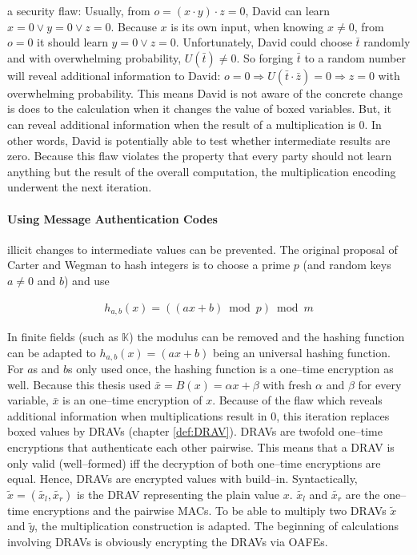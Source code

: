 a security flaw: Usually, from $o = (x \cdot y) \cdot z = 0$, David can learn $x
= 0 \vee y = 0 \vee z = 0$. Because $x$ is its own input, when knowing $x \neq
0$, from $o = 0$ it should learn $y = 0 \vee z = 0$.  Unfortunately, David could
choose $\bar{t}$ randomly and with overwhelming probability, $U(\bar{t}) \neq
0$. So forging $\bar{t}$ to a random number will reveal additional information
to David: $o = 0 \Rightarrow U(\bar{t} \cdot \bar{z}) = 0 \Rightarrow z = 0$
with overwhelming probability. This means David is not aware of the concrete
change is does to the calculation when it changes the value of boxed variables.
But, it can reveal additional information when the result of a multiplication is
$0$. In other words, David is potentially able to test whether intermediate
results are zero. Because this flaw violates the property that every party
should not learn anything but the result of the overall computation, the
multiplication encoding underwent the next iteration.

\paragraph{Using Message Authentication Codes} illicit changes to intermediate
values can be prevented. The original proposal of Carter and Wegman
\cite{carter79} to hash integers is to choose a prime $p$ (and random keys $a
\neq 0$ and $b$) and use

\begin{align*}
  h_{a,b}(x) = ((ax + b) \bmod p) \bmod m
\end{align*}

\noindent{}In finite fields (such as $\mathbb{K}$) the modulus can be removed
and the hashing function can be adapted to $h_{a,b}(x) = (ax + b)$ being an
universal hashing function. For $a$s and $b$s only used once, the hashing
function is a one--time encryption as well. Because this thesis used $\bar{x} =
B(x) = \alpha x + \beta$ with fresh $\alpha$ and $\beta$ for every variable,
$\bar{x}$ is an one--time encryption of $x$. Because of the flaw which reveals
additional information when multiplications result in $0$, this iteration
replaces boxed values by DRAVs (chapter \ref{def:DRAV}). DRAVs are twofold
one--time encryptions that authenticate each other pairwise. This means that a
DRAV is only valid (well--formed) iff the decryption of both one--time
encryptions are equal. Hence, DRAVs are encrypted values with  build--in. Syntactically, $\widetilde{x} =
(\widetilde{x_l}, \widetilde{x_r})$ is the DRAV representing the plain value
$x$. $\widetilde{x_l}$ and $\widetilde{x_r}$ are the one--time encryptions and
the pairwise MACs. To be able to multiply two DRAVs $\widetilde{x}$ and
$\widetilde{y}$, the multiplication construction is adapted. The beginning of
calculations involving DRAVs is obviously encrypting the DRAVs via OAFEs.

